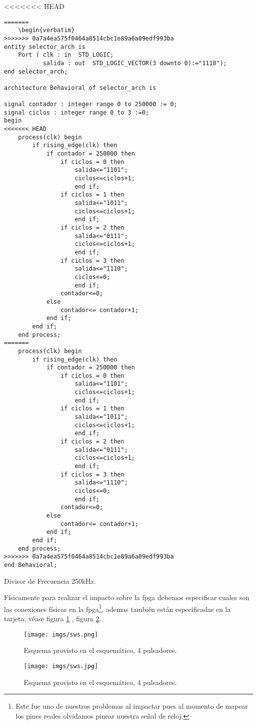 \documentclass[paper=a4, fontsize=12pt]{article}        %
\numberwithin{equation}{section}                        %
\numberwithin{table}{section}                           %
\numberwithin{equation}{section}						%
\numberwithin{table}{section} 							%
\begin{document}
\begin{listing}[H]
<<<<<<< HEAD
    \begin{verbatim}
=======
	\begin{verbatim}
>>>>>>> 0a7a4ea575f0464a8514cbc1e89a6a09edf993ba
entity selector_arch is
    Port ( clk : in  STD_LOGIC;
           salida : out  STD_LOGIC_VECTOR(3 downto 0):="1110");
end selector_arch;

architecture Behavioral of selector_arch is

signal contador : integer range 0 to 250000 := 0;
signal ciclos : integer range 0 to 3 :=0;
begin
<<<<<<< HEAD
    process(clk) begin
        if rising_edge(clk) then
            if contador = 250000 then
                if ciclos = 0 then
                    salida<="1101";
                    ciclos<=ciclos+1;
                    end if;
                if ciclos = 1 then
                    salida<="1011";
                    ciclos<=ciclos+1;
                    end if;
                if ciclos = 2 then
                    salida<="0111";
                    ciclos<=ciclos+1;
                    end if;
                if ciclos = 3 then
                    salida<="1110";
                    ciclos<=0;
                    end if;
                contador<=0;
            else
                contador<= contador+1;
            end if;
        end if;
    end process;
=======
	process(clk) begin
		if rising_edge(clk) then
			if contador = 250000 then
				if ciclos = 0 then
					salida<="1101";
					ciclos<=ciclos+1;
					end if;
				if ciclos = 1 then
					salida<="1011";
					ciclos<=ciclos+1;
					end if;
				if ciclos = 2 then
					salida<="0111";
					ciclos<=ciclos+1;
					end if;
				if ciclos = 3 then
					salida<="1110";
					ciclos<=0;
					end if;
				contador<=0;
			else
				contador<= contador+1;
			end if;
		end if;
	end process;
>>>>>>> 0a7a4ea575f0464a8514cbc1e89a6a09edf993ba
end Behavioral;
\end{verbatim}
\caption{Divisor de Frecuencia 250kHz.}
    \label{mux2}
\end{listing}

Físicamente para realizar el impacto sobre la fpga debemos especificar cuales son las conexiones físicas en la fpga\footnote{Este fue uno de nuestros problemas al impactar pues al momento de mapear los pines reales olvidamos pinear nuestra señal de reloj.}, ademas también están especificadas en la tarjeta. véase figura \ref{Sw1} , figura \ref{Sw2}.
\begin{figure}[H]
  \centering
     \texttt{[image: imgs/sws.png]}
  \caption{Esquema provisto en el esquemático, 4 pulsadores.}
    \label{Sw1}
\end{figure}
\begin{figure}[H]
  \centering
     \texttt{[image: imgs/sws.jpg]}
  \caption{Esquema provisto en el esquemático, 4 pulsadores.}
    \label{Sw2}
\end{figure}
\end{document}
